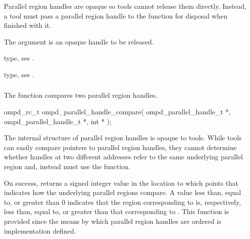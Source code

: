 \descr
Parallel region handles are opaque so tools cannot release them directly. 
Instead, a tool must pass a parallel region handle to the 
 function for disposal when finished with it.

\argdesc
The  argument is an opaque handle to be released.

\begin{crossrefs}
\item {} type, 
see .

\item {} type, see .
\end{crossrefs}



\subsubsection{}
\label{subsubsubsec:ompd_parallel_handle_compare}

\summary
The  function compares two parallel 
region handles.

\format
\begin{cspecific}
\begin{ompSyntax}
ompd_rc_t ompd_parallel_handle_compare(
  ompd_parallel_handle_t *,
  ompd_parallel_handle_t *,
  int *
);
\end{ompSyntax}
\end{cspecific}

\descr
The internal structure of parallel region handles is opaque to tools. While 
tools can easily compare pointers to parallel region handles, they cannot 
determine whether handles at two different addresses refer to the same 
underlying parallel region and, instead must use the 
 function.

On success,  returns a signed integer value 
in the location to which  points that indicates how the underlying 
parallel regions compare. A value less than, equal to, or greater than 0 indicates
that the region corresponding to  is, respectively, less 
than, equal to, or greater than that corresponding to .
This function is provided since the means by which parallel region handles are 
ordered is implementation defined.


